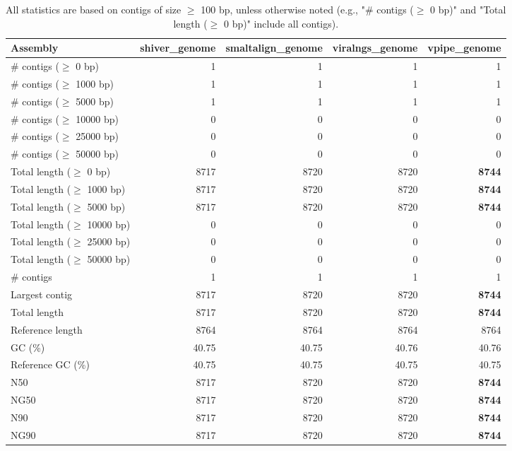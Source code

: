 \documentclass[12pt,a4paper]{article}
\begin{document}
\begin{table}[ht]
\begin{center}
\caption{All statistics are based on contigs of size $\geq$ 100 bp, unless otherwise noted (e.g., "\# contigs ($\geq$ 0 bp)" and "Total length ($\geq$ 0 bp)" include all contigs).}
\begin{tabular}{|l*{4}{|r}|}
\hline
Assembly & shiver\_genome & smaltalign\_genome & viralngs\_genome & vpipe\_genome \\ \hline
\# contigs ($\geq$ 0 bp) & 1 & 1 & 1 & 1 \\ \hline
\# contigs ($\geq$ 1000 bp) & 1 & 1 & 1 & 1 \\ \hline
\# contigs ($\geq$ 5000 bp) & 1 & 1 & 1 & 1 \\ \hline
\# contigs ($\geq$ 10000 bp) & 0 & 0 & 0 & 0 \\ \hline
\# contigs ($\geq$ 25000 bp) & 0 & 0 & 0 & 0 \\ \hline
\# contigs ($\geq$ 50000 bp) & 0 & 0 & 0 & 0 \\ \hline
Total length ($\geq$ 0 bp) & 8717 & 8720 & 8720 & {\bf 8744} \\ \hline
Total length ($\geq$ 1000 bp) & 8717 & 8720 & 8720 & {\bf 8744} \\ \hline
Total length ($\geq$ 5000 bp) & 8717 & 8720 & 8720 & {\bf 8744} \\ \hline
Total length ($\geq$ 10000 bp) & 0 & 0 & 0 & 0 \\ \hline
Total length ($\geq$ 25000 bp) & 0 & 0 & 0 & 0 \\ \hline
Total length ($\geq$ 50000 bp) & 0 & 0 & 0 & 0 \\ \hline
\# contigs & 1 & 1 & 1 & 1 \\ \hline
Largest contig & 8717 & 8720 & 8720 & {\bf 8744} \\ \hline
Total length & 8717 & 8720 & 8720 & {\bf 8744} \\ \hline
Reference length & 8764 & 8764 & 8764 & 8764 \\ \hline
GC (\%) & 40.75 & 40.75 & 40.76 & 40.76 \\ \hline
Reference GC (\%) & 40.75 & 40.75 & 40.75 & 40.75 \\ \hline
N50 & 8717 & 8720 & 8720 & {\bf 8744} \\ \hline
NG50 & 8717 & 8720 & 8720 & {\bf 8744} \\ \hline
N90 & 8717 & 8720 & 8720 & {\bf 8744} \\ \hline
NG90 & 8717 & 8720 & 8720 & {\bf 8744} \\ \hline

\end{tabular}
\end{center}
\end{table}
\end{document}
